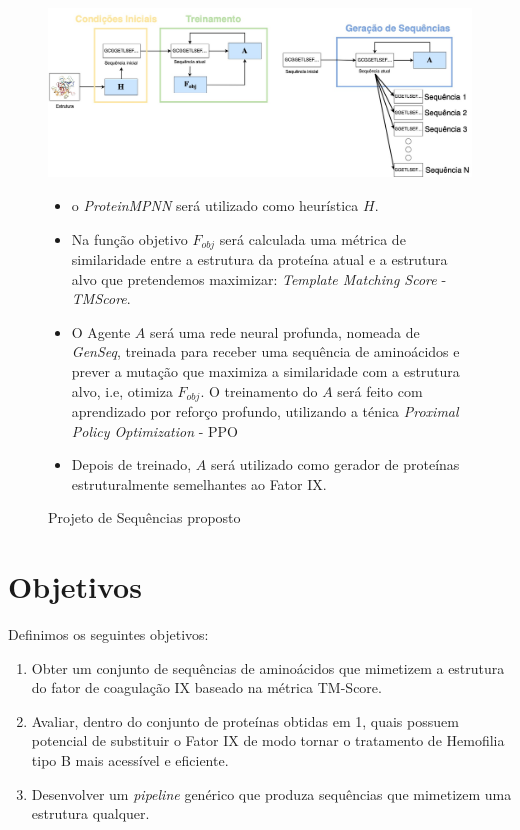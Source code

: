 \begin{figure}[H]
  \centering
  \includegraphics[width=.8\textwidth]{figuras/metodologia-pipeline_proposta.jpg}
  \begin{itemize}
  \item o \textit{ProteinMPNN} será utilizado como heurística $H$. 
  \item Na função objetivo $F_{obj}$ será calculada uma métrica de similaridade entre a estrutura da proteína atual 
  e a estrutura alvo que pretendemos maximizar: \textit{Template Matching Score} - \textit{TMScore}.
  \item O Agente $A$ será uma rede neural profunda, nomeada de  \textit{GenSeq},
  treinada para receber uma sequência de aminoácidos e prever a mutação que maximiza a similaridade com a estrutura alvo, i.e, otimiza $F_{obj}$. 
  O treinamento do $A$ será feito com aprendizado por reforço profundo, utilizando a ténica \textit{Proximal Policy Optimization} - PPO
  \item Depois de treinado, $A$ será utilizado como gerador de proteínas estruturalmente semelhantes ao Fator IX. 
\end{itemize}
  \caption{Projeto de Sequências proposto} 
  \label{fig:proposta}
\end{figure}

\section{Objetivos} 

Definimos os seguintes objetivos:

\begin{enumerate}
  \item Obter um conjunto de sequências de aminoácidos que mimetizem a estrutura do fator de coagulação IX baseado na métrica TM-Score.
  \item Avaliar, dentro do conjunto de proteínas obtidas em 1, quais possuem potencial de substituir o Fator IX de modo tornar o tratamento de Hemofilia tipo B mais acessível e eficiente.
  \item Desenvolver um \textit{pipeline} genérico que produza sequências que mimetizem uma estrutura qualquer.
\end{enumerate}






 
